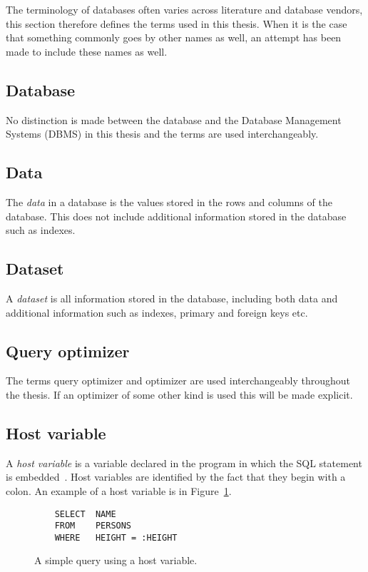 The terminology of databases often varies across literature and database
vendors, this section therefore defines the terms used in this thesis. When
it is the case that something commonly goes by other names as well, an attempt
has been made to include these names as well.

\subsection*{Database}
No distinction is made between the database and the Database Management Systems
(DBMS) in this thesis and the terms are used interchangeably.

\subsection*{Data}
The \textit{data} in a database is the values stored in the rows and columns of
the database. This does not include additional information stored in the
database such as indexes.

\subsection*{Dataset}
A \textit{dataset} is all information stored in the database, including both
data and additional information such as indexes, primary and foreign keys etc.

\subsection*{Query optimizer}
The terms query optimizer and optimizer are used interchangeably throughout the
thesis. If an optimizer of some other kind is used this will be made explicit.

\subsection*{Host variable}
A \textit{host variable} is a variable declared in the program in which the SQL
statement is embedded~\cite[p. 151]{chamberlin_1998_complete_acgtdud}. Host
variables are identified by the fact that they begin with a colon. An example of
a host variable is  in Figure~\ref{fig:sql:hostvar}.

\begin{figure}[ht]
  \begin{verbatim}
    SELECT  NAME
    FROM    PERSONS
    WHERE   HEIGHT = :HEIGHT
  \end{verbatim}
  \caption[A query with a host variable]{A simple query using a host
    variable.}\label{fig:sql:hostvar}
\end{figure}

